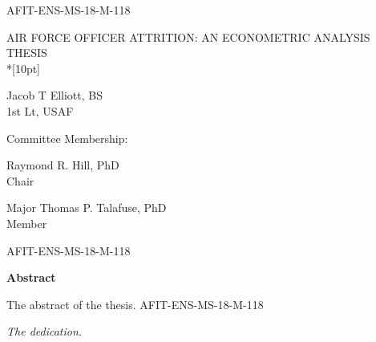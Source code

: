 \documentclass[12pt,letterpaper,toc=flat,oneside]{report}
\theoremstyle{definition}
\theoremstyle{definition}
\theoremstyle{definition}
\theoremstyle{remark}
\begin{document}
	\thispagestyle{empty}
	\setcounter{page}{3}
	\noindent AFIT-ENS-MS-18-M-118
	\vfill
	\begin{center}
	    \MakeUppercase{Air Force Officer Attrition: An Econometric Analysis}\\[10pt]
	    \MakeUppercase{Thesis}\\*[10pt]
	    
	    \begingroup
  \singlespace
    Jacob T Elliott, BS\\ 
    1st Lt, \MakeUppercase{USAF}
    \par
  \endgroup
  
	\bigskip\medskip
	Committee Membership:
	\bigskip\medskip
	
	\begingroup
  \singlespace
    Raymond R. Hill, PhD\\ 
    Chair
    \par
  \endgroup
  \bigskip\bigskip
  
  \begingroup
  \singlespace
    Major Thomas P. Talafuse, PhD\\ 
    Member
    \par
  \endgroup
  \bigskip\bigskip
  
    
    
    
  	\end{center}
	\vfill
	\newpage
	\setcounter{page}{4}
	\renewcommand{\thepage}{\roman{page}}
    \thispagestyle{plain}
    \noindent AFIT-ENS-MS-18-M-118
    \begin{center}
	\Large\bfseries Abstract
    \end{center}
    \vspace{2em}
    The abstract of the thesis.
    \newpage
       \noindent 
       AFIT-ENS-MS-18-M-118
       \vfill
       \begin{center}
	   \em{The dedication.}
	   \end{center}
	   \vfill
      \newpage
\end{document}
